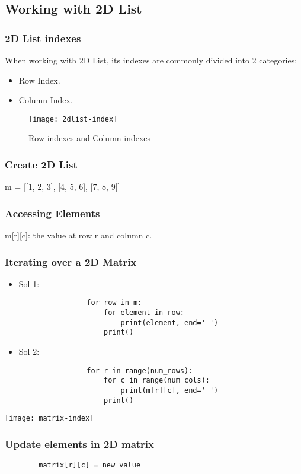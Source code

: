 \subsection{Working with 2D List}
\subsubsection{2D List indexes}
When working with 2D List, its indexes are commonly divided into 2 categories:
\begin{itemize}
	\item Row Index.
	\item Column Index.
\end{itemize}

\begin{figure}[h]
	\centering
	\texttt{[image: 2dlist-index]}
	\caption{Row indexes and Column indexes}
	\label{fig:2dindex}
\end{figure}

\subsubsection{Create 2D List}
	\begin{center}
		m = [[1, 2, 3], [4, 5, 6], [7, 8, 9]]
	\end{center}

\subsubsection{Accessing Elements}
	\begin{center}
		m[r][c]: the value at row r and column c.
	\end{center}
	
\subsubsection{Iterating over a 2D Matrix}
\noindent
\begin{minipage}[c]{0.55\textwidth}
	\begin{itemize}
		\item Sol 1:
			\begin{verbatim}
				for row in m:
					for element in row:
						print(element, end=' ')
					print()
			\end{verbatim}
		\item Sol 2:
			\begin{verbatim}
				for r in range(num_rows):
					for c in range(num_cols):
						print(m[r][c], end=' ')
					print()
			\end{verbatim}
	\end{itemize}
\end{minipage}%
\hfill
\begin{minipage}[t]{0.4\textwidth}
	\texttt{[image: matrix-index]}
\end{minipage}


\subsubsection{Update elements in 2D matrix}
\begin{center}
	\begin{verbatim}
		matrix[r][c] = new_value
	\end{verbatim}
\end{center}